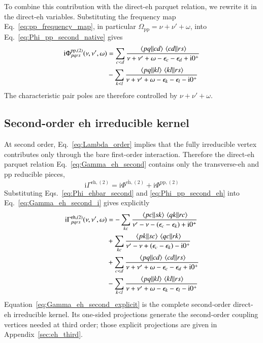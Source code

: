 \documentclass[aip,jcp,reprint,noshowkeys,superscriptaddress]{revtex4-1}
\newcommand{\eps}{\epsilon}
\newcommand{\ii}{\mathrm{i}}
\newcommand{\eh}{\text{eh}}
\newcommand{\teh}{\overline{\text{eh}}}
\newcommand{\pp}{\text{pp}}
\begin{document}
To combine this contribution with the direct-$\eh$ parquet relation, we
rewrite it in the direct-$\eh$ variables.
Substituting the frequency map Eq.~\eqref{eq:pp_frequency_map}, in
particular $\Omega_\pp=\nu+\nu'+\omega$, into
Eq.~\eqref{eq:Phi_pp_second_native} gives
\begin{equation}
	\begin{split}
	\ii\Phi^{\pp,(2)}_{pqrs}(\nu,\nu',\omega)
	&=
	\sum_{c<d}
	\frac{
	\mel{pq}{}{cd}
	\mel{cd}{}{rs}
	}
	{\nu+\nu'+\omega-\eps_c-\eps_d+\ii0^+}
	\\
	&-
	\sum_{k<l}
	\frac{
	\mel{pq}{}{kl}
	\mel{kl}{}{rs}
	}
	{\nu+\nu'+\omega-\eps_k-\eps_l-\ii0^+}
	\end{split}
	\label{eq:Phi_pp_second_eh}
\end{equation}
The characteristic pair poles are therefore controlled by
$\nu+\nu'+\omega$.

\subsection{Second-order eh irreducible kernel}

At second order, Eq.~\eqref{eq:Lambda_order} implies that the fully
irreducible vertex contributes only through the bare first-order
interaction.
Therefore the direct-$\eh$ parquet relation
Eq.~\eqref{eq:Gamma_eh_second} contains only the transverse-$\eh$ and
$\pp$ reducible pieces,
\begin{equation}
	\ii\Gamma^{\eh,(2)}
	=
	\ii\Phi^{\teh,(2)}
	+
	\ii\Phi^{\pp,(2)}
	\label{eq:Gamma_eh_second_i}
\end{equation}
Substituting Eqs.~\eqref{eq:Phi_ehbar_second} and
\eqref{eq:Phi_pp_second_eh} into Eq.~\eqref{eq:Gamma_eh_second_i} gives
explicitly
\begin{equation}
	\begin{split}
	\ii\Gamma^{\eh,(2)}_{pqrs}(\nu,\nu',\omega)
	&=
	-
	\sum_{kc}
	\frac{
	\mel{pc}{}{sk}
	\mel{qk}{}{rc}
	}
	{\nu'-\nu-(\eps_c-\eps_k)+\ii0^+}
	\\
	&+
	\sum_{kc}
	\frac{
	\mel{pk}{}{sc}
	\mel{qc}{}{rk}
	}
	{\nu'-\nu+(\eps_c-\eps_k)-\ii0^+}
	\\
	&+
	\sum_{c<d}
	\frac{
	\mel{pq}{}{cd}
	\mel{cd}{}{rs}
	}
	{\nu+\nu'+\omega-\eps_c-\eps_d+\ii0^+}
	\\
	&-
	\sum_{k<l}
	\frac{
	\mel{pq}{}{kl}
	\mel{kl}{}{rs}
	}
	{\nu+\nu'+\omega-\eps_k-\eps_l-\ii0^+}
	\end{split}
	\label{eq:Gamma_eh_second_explicit}
\end{equation}
Equation~\eqref{eq:Gamma_eh_second_explicit} is the complete
second-order direct-$\eh$ irreducible kernel.
Its one-sided projections generate the second-order coupling vertices needed
at third order; those explicit projections are given in Appendix~\ref{sec:eh_third}.
\end{document}

